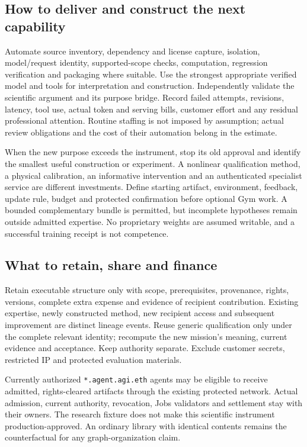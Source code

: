 \documentclass[11pt,letterpaper]{article}
\begin{document}
\subsection{How to deliver and construct the next capability}
Automate source inventory, dependency and license capture, isolation, model/request identity, supported-scope checks, computation, regression verification and packaging where suitable. Use the strongest appropriate verified model and tools for interpretation and construction. Independently validate the scientific argument and its purpose bridge. Record failed attempts, revisions, latency, tool use, actual token and serving bills, customer effort and any residual professional attention. Routine staffing is not imposed by assumption; actual review obligations and the cost of their automation belong in the estimate.

When the new purpose exceeds the instrument, stop its old approval and identify the smallest useful construction or experiment. A nonlinear qualification method, a physical calibration, an informative intervention and an authenticated specialist service are different investments. Define starting artifact, environment, feedback, update rule, budget and protected confirmation before optional Gym work. A bounded complementary bundle is permitted, but incomplete hypotheses remain outside admitted expertise. No proprietary weights are assumed writable, and a successful training receipt is not competence.

\subsection{What to retain, share and finance}
Retain executable structure only with scope, prerequisites, provenance, rights, versions, complete extra expense and evidence of recipient contribution. Existing expertise, newly constructed method, new recipient access and subsequent improvement are distinct lineage events. Reuse generic qualification only under the complete relevant identity; recompute the new mission's meaning, current evidence and acceptance. Keep authority separate. Exclude customer secrets, restricted IP and protected evaluation materials.

Currently authorized \texttt{*.agent.agi.eth} agents may be eligible to receive admitted, rights-cleared artifacts through the existing protected network. Actual admission, current authority, revocation, Jobs validators and settlement stay with their owners. The research fixture does not make this scientific instrument production-approved. An ordinary library with identical contents remains the counterfactual for any graph-organization claim.
\end{document}
